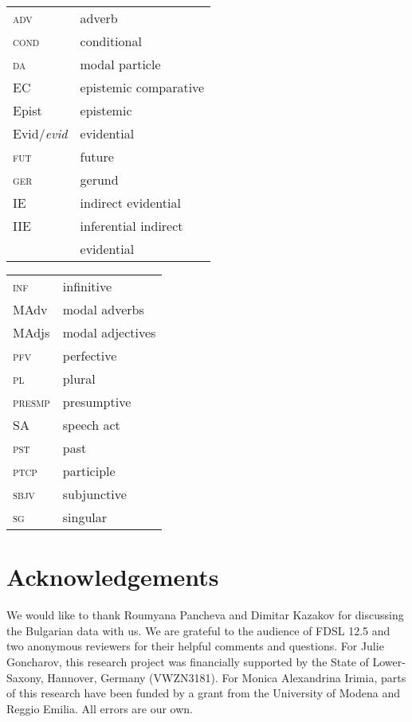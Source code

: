 \documentclass[output=paper,colorlinks,citecolor=brown,newtxmath]{langsci/langscibook}
\begin{document}
\begin{tabularx}{.47\textwidth}{ll}
\textsc{adv}&adverb\\
\textsc{cond}&conditional\\
\textsc{da}&{modal} particle\\
{EC}&{epistemic} {comparative}\\
{Epist}&{epistemic}\\
{Evid}/\textit{evid}&{evidential}\\
\textsc{fut}&future\\
\textsc{ger}&gerund\\
{IE}&indirect {evidential}\\
{IIE}&inferential indirect\\
& {evidential}\\
\end{tabularx}
\begin{tabularx}{.47\textwidth}{ll}
\textsc{inf}&{infinitive}\\
{MAdv}&{modal} adverbs\\
{MAdjs}&{modal} adjectives\\
\textsc{pfv}&{perfective}\\
\textsc{pl}&plural\\
\textsc{presmp}&presumptive\\
{SA}&{speech act}\\
\textsc{pst}&past\\
\textsc{ptcp}&{participle}\\
\textsc{sbjv}&{subjunctive}\\
\textsc{sg}&singular\\
\end{tabularx}

\section*{Acknowledgements}
We would like to thank Roumyana Pancheva and Dimitar Kazakov for discussing the Bulgarian data with us. We are grateful to the audience of FDSL 12.5 and two anonymous reviewers for their helpful comments and questions. For Julie Goncharov, this research project was financially supported by the State of Lower-Saxony, Hannover, Germany (VWZN3181). For Monica Alexandrina Irimia, parts of this research have been funded by a grant from the University of Modena and Reggio Emilia. All errors are our own.

\sloppy
\printbibliography[heading=subbibliography,notkeyword=this]

\end{document}
